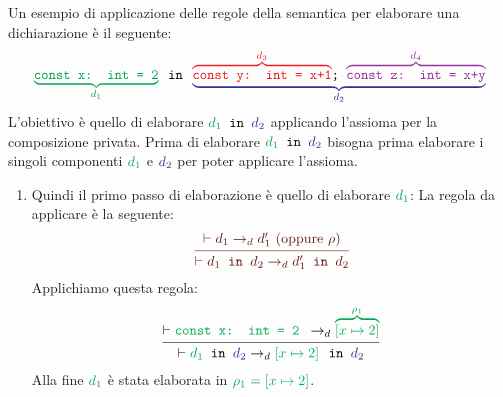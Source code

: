 \documentclass[a4paper]{article}
\begin{document}
\begin{example}
  \newcommand\dOne{Green}
  \newcommand\dTwo{Blue}
  \newcommand\dThree{Red}
  \newcommand\dFour{Purple}
  \newcommand\dRule{Sepia}
  Un esempio di applicazione delle regole della semantica per elaborare una dichiarazione
  è il seguente:
  \[
    \mathcolor{\dOne}{
      \underbrace{
        \texttt{const x: int = 2}
      }_{\mathcolor{\dOne}{d_1}}
    }
    \texttt{ in }
    \mathcolor{\dTwo}{
      \underbrace{
        \textcolor{\dThree}{
          \overbrace{
            \texttt{const y: int = x+1}
          }^{\mathcolor{\dThree}{d_3}}
        }
        \texttt{\textcolor{black}{;} }
        \textcolor{\dFour}{
          \overbrace{
            \texttt{const z: int = x+y}
          }^{\mathcolor{\dFour}{d_4}}
        }
      }_{\mathcolor{\dTwo}{d_2}}
    }
  \]
  L'obiettivo è quello di elaborare
  \( 
  \mathcolor{\dOne}{d_1}
  \texttt{ in }
  \mathcolor{\dTwo}{d_2}
  \) applicando l'assioma per la composizione privata.
  Prima di elaborare \( \mathcolor{\dOne}{d_1} \texttt{ in } \mathcolor{\dTwo}{d_2} \)
  bisogna prima elaborare i singoli componenti \( \mathcolor{\dOne}{d_1} \) e
  \( \mathcolor{\dTwo}{d_2} \) per poter applicare l'assioma.
  \begin{enumerate}
    \item Quindi il primo passo di elaborazione è quello di elaborare
      \( \mathcolor{\dOne}{d_1} \):
      La regola da applicare è la seguente:
      \begin{equation}\label{eq:rule_d1}
        \color{\dRule}
        \begin{prooftree}
          \hypo{ 
            \vdash d_1 \to_d d_1' \text{ (oppure } \rho \text{)}
          }
          \infer1{ 
            \vdash d_1 \texttt{ in } d_2 \to_d d_1' \texttt{ in } d_2
          }
        \end{prooftree}
      \end{equation} 
      Applichiamo questa regola:
      \[
        \begin{prooftree}
          \hypo{ 
            \vdash \texttt{%
              \textcolor{\dOne}{
                const x: int = 2%
              }
            }
            \to_d
            \mathcolor{\dOne}{
              \overbrace{
                \left[ x \mapsto 2 \right]
              }^{\rho_1}
            }
          }
          \infer1{ 
            \vdash \mathcolor{\dOne}{d_1} \texttt{ in } \mathcolor{\dTwo}{d_2}
            \to_d
            \mathcolor{\dOne}{\left[ x \mapsto 2 \right]}
            \texttt{ in }
            \mathcolor{\dTwo}{d_2}
          }
        \end{prooftree}
      \] 
      Alla fine \( \mathcolor{\dOne}{d_1} \) è stata elaborata in
      \( \mathcolor{\dOne}{\rho_1 = \left[ x \mapsto 2 \right]} \).


\end{enumerate}
\end{example}
\end{document}
